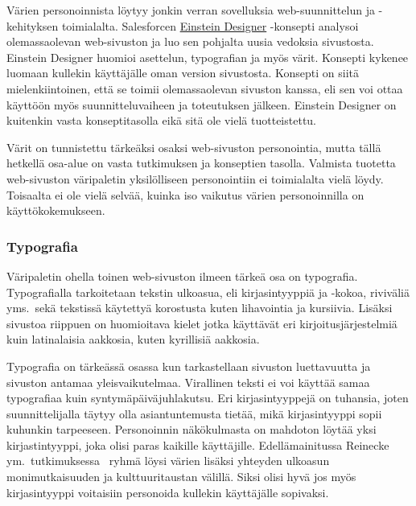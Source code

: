 \documentclass[finnish, 12pt, a4paper, elec, utf8, a-1b, online]{aaltothesis}
\begin{document}
Värien personoinnista löytyy jonkin verran sovelluksia web-suunnittelun ja
-kehityksen toimialalta. Salesforcen
\href{https://medium.com/salesforce-ux/einstein-designer-ai-powered-personalized-design-at-scale-367d71b85a3d}{Einstein
    Designer} -konsepti analysoi olemassaolevan web-sivuston ja luo sen pohjalta
uusia vedoksia sivustosta. Einstein Designer huomioi asettelun, typografian ja
myös värit. Konsepti kykenee luomaan kullekin käyttäjälle oman version
sivustosta. Konsepti on siitä mielenkiintoinen, että se toimii olemassaolevan
sivuston kanssa, eli sen voi ottaa käyttöön myös suunnitteluvaiheen ja
toteutuksen jälkeen. Einstein Designer on kuitenkin vasta konseptitasolla eikä
sitä ole vielä tuotteistettu.

Värit on tunnistettu tärkeäksi osaksi web-sivuston personointia, mutta tällä
hetkellä osa-alue on vasta tutkimuksen ja konseptien tasolla. Valmista tuotetta
web-sivuston väripaletin yksilölliseen personointiin ei toimialalta vielä löydy.
Toisaalta ei ole vielä selvää, kuinka iso vaikutus värien personoinnilla on
käyttökokemukseen.

\subsubsection{Typografia}

Väripaletin ohella toinen web-sivuston ilmeen tärkeä osa on typografia.
Typografialla tarkoitetaan tekstin ulkoasua, eli kirjasintyyppiä ja -kokoa,
riviväliä yms.~sekä tekstissä käytettyä korostusta kuten lihavointia ja
kursiivia. Lisäksi sivustoa riippuen on huomioitava kielet jotka käyttävät eri
kirjoitusjärjestelmiä kuin latinalaisia aakkosia, kuten kyrillisiä aakkosia.

Typografia on tärkeässä osassa kun tarkastellaan sivuston luettavuutta ja
sivuston antamaa yleisvaikutelmaa. Virallinen teksti ei voi käyttää samaa
typografiaa kuin syntymäpäiväjuhlakutsu. Eri kirjasintyyppejä on tuhansia, joten
suunnittelijalla täytyy olla asiantuntemusta tietää, mikä kirjasintyyppi sopii
kuhunkin tarpeeseen. Personoinnin näkökulmasta on mahdoton löytää yksi
kirjastintyyppi, joka olisi paras kaikille käyttäjille. Edellämainitussa
Reinecke ym.~tutkimuksessa~\cite{10.1145/2556288.2557052} ryhmä löysi värien
lisäksi yhteyden ulkoasun monimutkaisuuden ja kulttuuritaustan välillä. Siksi
olisi hyvä jos myös kirjasintyyppi voitaisiin personoida kullekin käyttäjälle
sopivaksi.
\end{document}
